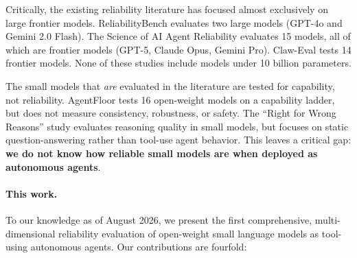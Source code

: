 Critically, the existing reliability literature has focused almost exclusively on large frontier models. ReliabilityBench \cite{gupta2026reliabilitybench} evaluates two large models (GPT-4o and Gemini 2.0 Flash). The Science of AI Agent Reliability \cite{rabanser2026science} evaluates 15 models, all of which are frontier models (GPT-5, Claude Opus, Gemini Pro). Claw-Eval \cite{claw2026eval} tests 14 frontier models. None of these studies include models under 10 billion parameters.

The small models that \emph{are} evaluated in the literature are tested for capability, not reliability. AgentFloor \cite{karmakar2026agentfloor} tests 16 open-weight models on a capability ladder, but does not measure consistency, robustness, or safety. The ``Right for Wrong Reasons'' study \cite{right2026wrong} evaluates reasoning quality in small models, but focuses on static question-answering rather than tool-use agent behavior. This leaves a critical gap: \textbf{we do not know how reliable small models are when deployed as autonomous agents}.

\paragraph{This work.}
To our knowledge as of August 2026, we present the first comprehensive, multi-dimensional reliability evaluation of open-weight small language models as tool-using autonomous agents. Our contributions are fourfold:

